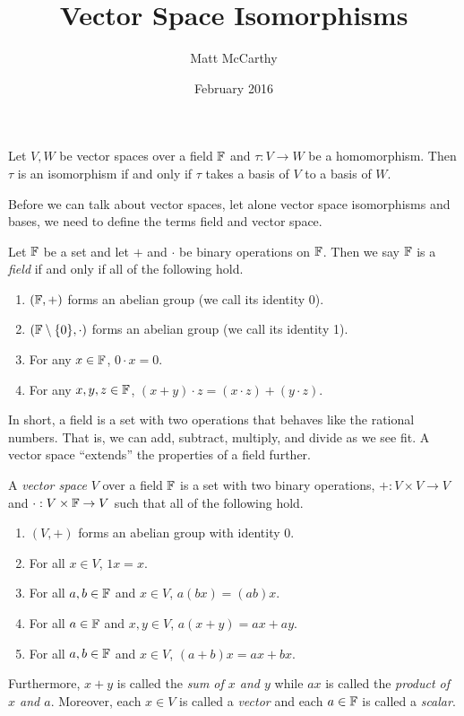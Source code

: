 \documentclass[notitlepage]{simple}
\author{Matt McCarthy}
\title{Vector Space Isomorphisms}
\date{February 2016}
\begin{document}
	\maketitle

	\begin{thm*}
		Let $V,W$ be vector spaces over a field $\mathbb{F}$ and $\tau: V\rightarrow W$ be a homomorphism.
		Then $\tau$ is an isomorphism if and only if $\tau$ takes a basis of $V$ to a basis of $W$.
	\end{thm*}

	Before we can talk about vector spaces, let alone vector space isomorphisms and bases, we need to define the terms field and vector space.

	\begin{definition}[Field]
		Let $\mathbb{F}$ be a set and let $+$ and $\cdot$ be binary operations on $\mathbb{F}$.
		Then we say $\mathbb{F}$ is a \textit{field} if and only if all of the following hold.
		\begin{enumerate}
			\item $(\mathbb{F},+)$ forms an abelian group (we call its identity 0).
			\item $(\mathbb{F}\setminus\lbrace 0 \rbrace,\cdot)$ forms an abelian group (we call its identity 1).
			\item For any $x\in\mathbb{F}$, $0\cdot x = 0$.
			\item For any $x,y,z\in\mathbb{F}$, $(x+y)\cdot z= (x\cdot z)+(y\cdot z)$.
		\end{enumerate}
	\end{definition}

	In short, a field is a set with two operations that behaves like the rational numbers.
	That is, we can add, subtract, multiply, and divide as we see fit.
	A vector space ``extends'' the properties of a field further.

	\begin{definition}
		A \textit{vector space} $V$ over a field $\mathbb{F}$ is a set with two binary operations, $+:V\times V\rightarrow V$ and $\cdot:V\times\mathbb{F}\rightarrow V$ such that all of the following hold.
		\begin{enumerate}
			\item $(V,+)$ forms an abelian group with identity 0.
			\item For all $x\in V$, $1x=x$.
			\item For all $a,b\in\mathbb{F}$ and $x\in V$, $a(bx)=(ab)x$.
			\item For all $a\in\mathbb{F}$ and $x,y\in V$, $a(x+y)=ax+ay$.
			\item For all $a,b\in\mathbb{F}$ and $x\in V$, $(a+b)x=ax+bx$.
		\end{enumerate}
		Furthermore, $x+y$ is called the \textit{sum of $x$ and $y$} while $ax$ is called the \textit{product of $x$ and $a$}.
		Moreover, each $x\in V$ is called a \textit{vector} and each $a\in\mathbb{F}$ is called a \textit{scalar}.
	\end{definition}
\end{document}
